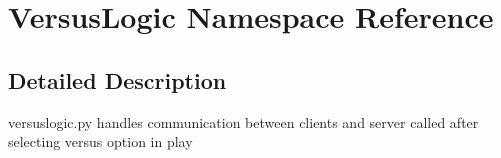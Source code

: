 \hypertarget{namespace_versus_logic}{}\section{Versus\+Logic Namespace Reference}
\label{namespace_versus_logic}


\subsection{Detailed Description}
\begin{DoxyVerb}versuslogic.py
handles communication between clients and server
called after selecting versus option in play
\end{DoxyVerb}
 